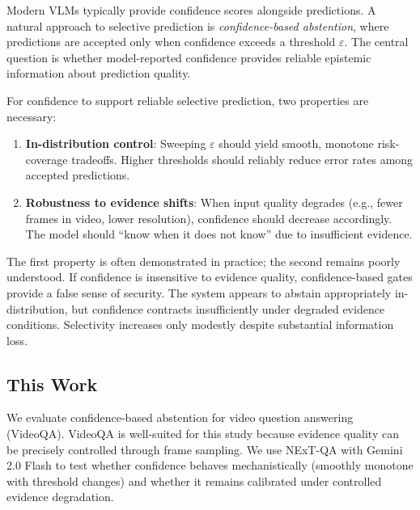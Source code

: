 \documentclass{article}
\begin{document}
Modern VLMs typically provide confidence scores alongside predictions. A natural approach to selective prediction is \emph{confidence-based abstention}, where predictions are accepted only when confidence exceeds a threshold $\varepsilon$. The central question is whether model-reported confidence provides reliable epistemic information about prediction quality.

For confidence to support reliable selective prediction, two properties are necessary:
\begin{enumerate}
    \item \textbf{In-distribution control}: Sweeping $\varepsilon$ should yield smooth, monotone risk-coverage tradeoffs. Higher thresholds should reliably reduce error rates among accepted predictions.
    \item \textbf{Robustness to evidence shifts}: When input quality degrades (e.g., fewer frames in video, lower resolution), confidence should decrease accordingly. The model should ``know when it does not know'' due to insufficient evidence.
\end{enumerate}

The first property is often demonstrated in practice; the second remains poorly understood. If confidence is insensitive to evidence quality, confidence-based gates provide a false sense of security. The system appears to abstain appropriately in-distribution, but confidence contracts insufficiently under degraded evidence conditions. Selectivity increases only modestly despite substantial information loss.

\subsection{This Work}

We evaluate confidence-based abstention for video question answering (VideoQA). VideoQA is well-suited for this study because evidence quality can be precisely controlled through frame sampling. We use NExT-QA \citep{nextqa} with Gemini 2.0 Flash to test whether confidence behaves mechanistically (smoothly monotone with threshold changes) and whether it remains calibrated under controlled evidence degradation.
\end{document}
